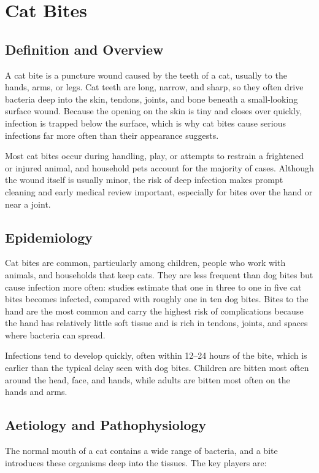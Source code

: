 \chapter{Cat Bites}

\section*{Definition and Overview}
A cat bite is a puncture wound caused by the teeth of a cat, usually to the hands, arms, or legs. Cat teeth are long, narrow, and sharp, so they often drive bacteria deep into the skin, tendons, joints, and bone beneath a small-looking surface wound. Because the opening on the skin is tiny and closes over quickly, infection is trapped below the surface, which is why cat bites cause serious infections far more often than their appearance suggests.

Most cat bites occur during handling, play, or attempts to restrain a frightened or injured animal, and household pets account for the majority of cases. Although the wound itself is usually minor, the risk of deep infection makes prompt cleaning and early medical review important, especially for bites over the hand or near a joint.

\section*{Epidemiology}
Cat bites are common, particularly among children, people who work with animals, and households that keep cats. They are less frequent than dog bites but cause infection more often: studies estimate that one in three to one in five cat bites becomes infected, compared with roughly one in ten dog bites. Bites to the hand are the most common and carry the highest risk of complications because the hand has relatively little soft tissue and is rich in tendons, joints, and spaces where bacteria can spread.

Infections tend to develop quickly, often within 12--24 hours of the bite, which is earlier than the typical delay seen with dog bites. Children are bitten most often around the head, face, and hands, while adults are bitten most often on the hands and arms.

\section*{Aetiology and Pathophysiology}
The normal mouth of a cat contains a wide range of bacteria, and a bite introduces these organisms deep into the tissues. The key players are:

